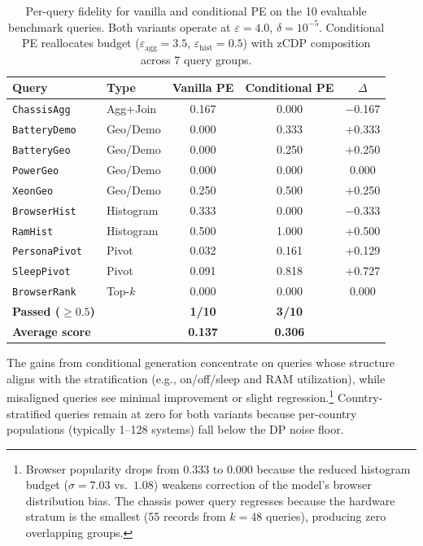 \documentclass[12pt,letterpaper]{article}
\renewcommand{\_}{\textunderscore\allowbreak}
\begin{document}
\begin{table}[H]
\centering
\small
\begin{tabular*}{\textwidth}{@{\extracolsep{\fill}}llccc}
\toprule
\textbf{Query} & \textbf{Type} & \textbf{Vanilla PE} & \textbf{Conditional PE} & \textbf{$\Delta$} \\
\midrule
\texttt{ChassisAgg} & Agg+Join & \cellcolor{scorelo}0.167 & \cellcolor{scorelo}0.000 & $-$0.167 \\
\midrule
\texttt{BatteryDemo} & Geo/Demo & \cellcolor{scorelo}0.000 & \cellcolor{scoremid}0.333 & +0.333 \\
\texttt{BatteryGeo} & Geo/Demo & \cellcolor{scorelo}0.000 & \cellcolor{scoremid}0.250 & +0.250 \\
\texttt{PowerGeo} & Geo/Demo & \cellcolor{scorelo}0.000 & \cellcolor{scorelo}0.000 & 0.000 \\
\texttt{XeonGeo} & Geo/Demo & \cellcolor{scoremid}0.250 & \cellcolor{scorehi}0.500 & +0.250 \\
\midrule
\texttt{BrowserHist} & Histogram & \cellcolor{scoremid}0.333 & \cellcolor{scorelo}0.000 & $-$0.333 \\
\texttt{RamHist} & Histogram & \cellcolor{scorehi}0.500 & \cellcolor{scorehi}1.000 & +0.500 \\
\midrule
\texttt{PersonaPivot} & Pivot & \cellcolor{scorelo}0.032 & \cellcolor{scorelo}0.161 & +0.129 \\
\texttt{SleepPivot} & Pivot & \cellcolor{scorelo}0.091 & \cellcolor{scorehi}0.818 & +0.727 \\
\midrule
\texttt{BrowserRank} & Top-$k$ & \cellcolor{scorelo}0.000 & \cellcolor{scorelo}0.000 & 0.000 \\
\midrule
\textbf{Passed ($\geq 0.5$)} & & \textbf{1/10} & \textbf{3/10} & \\
\textbf{Average score} & & \textbf{0.137} & \textbf{0.306} & \\
\bottomrule
\end{tabular*}
\caption{Per-query fidelity for vanilla and conditional PE on the 10 evaluable benchmark queries. Both variants operate at $\varepsilon = 4.0$, $\delta = 10^{-5}$. Conditional PE reallocates budget ($\varepsilon_{\text{agg}} = 3.5$, $\varepsilon_{\text{hist}} = 0.5$) with zCDP composition across 7 query groups.}
\label{tab:pe-fidelity}
\end{table}

The gains from conditional generation concentrate on queries whose structure aligns with the stratification (e.g., on/off/sleep and RAM utilization), while misaligned queries see minimal improvement or slight regression.\footnote{Browser popularity drops from 0.333 to 0.000 because the reduced histogram budget ($\sigma = 7.03$ vs.\ $1.08$) weakens correction of the model's browser distribution bias. The chassis power query regresses because the hardware stratum is the smallest (55 records from $k=48$ queries), producing zero overlapping groups.} Country-stratified queries remain at zero for both variants because per-country populations (typically 1--128 systems) fall below the DP noise floor.
\end{document}
